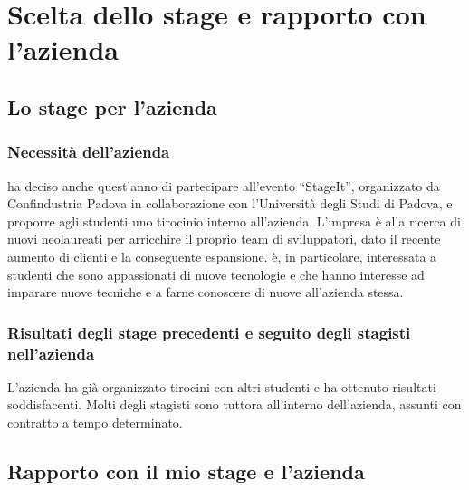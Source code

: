 \chapter{Scelta dello stage e rapporto con l'azienda}

\section{Lo stage per l'azienda}

   \subsection{Necessità dell'azienda}

   \nomeAzienda{} ha deciso anche quest'anno di partecipare all'evento ``StageIt'', organizzato da Confindustria Padova in collaborazione con l'Università degli Studi di Padova, e proporre agli studenti uno tirocinio interno all'azienda. L'impresa è alla ricerca di nuovi neolaureati per arricchire il proprio team di sviluppatori, dato il recente aumento di clienti e la conseguente espansione. \nomeAzienda{} è, in particolare, interessata a studenti che sono appassionati di nuove tecnologie e che hanno interesse ad imparare nuove tecniche e a farne conoscere di nuove all'azienda stessa.

   \subsection{Risultati degli stage precedenti e seguito degli stagisti nell'azienda}
   L'azienda ha già organizzato tirocini con altri studenti e ha ottenuto risultati soddisfacenti. Molti degli stagisti sono tuttora all'interno dell'azienda, assunti con contratto a tempo determinato.


\section{Rapporto con il mio stage e l'azienda}

